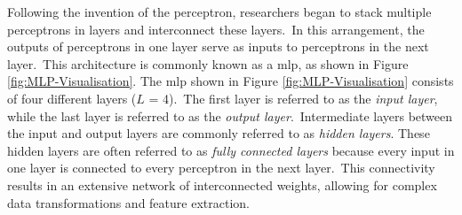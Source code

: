 \noindent
Following the invention of the perceptron, researchers began to stack multiple perceptrons in layers and interconnect these layers.\
In this arrangement, the outputs of perceptrons in one layer serve as inputs to perceptrons in the next layer.\
This architecture is commonly known as a \gls{mlp}, as shown in Figure \ref{fig:MLP-Visualisation}.
\newline
\newline
The \gls{mlp} shown in Figure \ref{fig:MLP-Visualisation} consists of four different layers ($L$ = 4).\
The first layer is referred to as the \textit{input layer}, while the last layer is referred to as the \textit{output layer}.\
Intermediate layers between the input and output layers are commonly referred to as \textit{hidden layers}.
\newline
\newline
These hidden layers are often referred to as \textit{fully connected layers} because every input in one layer is connected to every perceptron in the next layer.\
This connectivity results in an extensive network of interconnected weights, allowing for complex data transformations and feature extraction.

